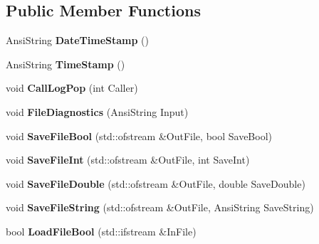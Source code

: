 \subsection*{Public Member Functions}
\begin{DoxyCompactItemize}
\item 
\mbox{\label{class_t_utilities_a9ca62e05ace8e6c4c33d377c26c48e55}} 
Ansi\+String {\bfseries Date\+Time\+Stamp} ()
\item 
\mbox{\label{class_t_utilities_a34bd6bb5305bc29afdf424f6d35a921c}} 
Ansi\+String {\bfseries Time\+Stamp} ()
\item 
\mbox{\label{class_t_utilities_ae1eddca13cc3c492839e131f40ec21c0}} 
void {\bfseries Call\+Log\+Pop} (int Caller)
\item 
\mbox{\label{class_t_utilities_a100a392ac8eeb3955796954a5afade36}} 
void {\bfseries File\+Diagnostics} (Ansi\+String Input)
\item 
\mbox{\label{class_t_utilities_a06a211ebaa112f3fac0edc5b238ef876}} 
void {\bfseries Save\+File\+Bool} (std\+::ofstream \&Out\+File, bool Save\+Bool)
\item 
\mbox{\label{class_t_utilities_a86ed634e8a9d7ca534a324954f4a7a2f}} 
void {\bfseries Save\+File\+Int} (std\+::ofstream \&Out\+File, int Save\+Int)
\item 
\mbox{\label{class_t_utilities_a92b5adfb8ad3a937a8d208bfd90a5741}} 
void {\bfseries Save\+File\+Double} (std\+::ofstream \&Out\+File, double Save\+Double)
\item 
\mbox{\label{class_t_utilities_a60531c6cb1a6a33dd71299d3a5b6cc21}} 
void {\bfseries Save\+File\+String} (std\+::ofstream \&Out\+File, Ansi\+String Save\+String)
\item 
\mbox{\label{class_t_utilities_a9a0ec4d0c686c71157c371d647824777}} 
bool {\bfseries Load\+File\+Bool} (std\+::ifstream \&In\+File)
\item 
\mbox{\label{class_t_utilities_a84bf39701305cf4814377d178d0fec8c}} 

\end{DoxyCompactItemize}
